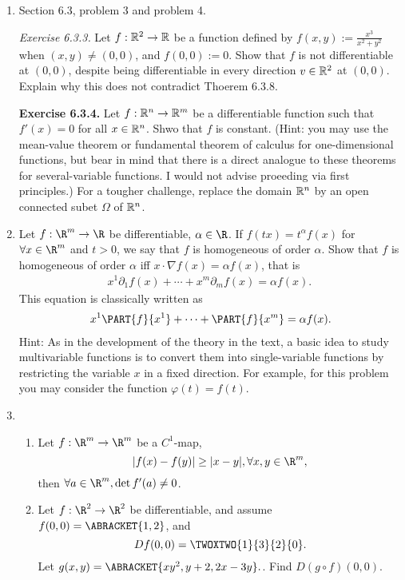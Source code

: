 \documentclass[10pt,a4paper]{report}
\begin{document}
\begin{enumerate}[label=\Roman*.]
	\item Section 6.3, problem 3 and problem 4.
	
	\textit{Exercise 6.3.3.}  Let $f: \mathbb{R}^2 \to \mathbb{R}$ be a function defined by $f(x,y) := \frac{x^3}{x^2+y^2}$ when $(x,y) \ne (0,0)$, and $f(0,0) := 0$.  Show that $f$ is not differentiable at $(0,0)$, despite being differentiable in every direction $v \in \mathbb{R}^2$ at $(0,0)$. Explain why this does not contradict Thoerem 6.3.8.
	
	\textbf{Exercise 6.3.4.}  Let $f: \mathbb{R}^n \to \mathbb{R}^m$ be a differentiable function such that $f'(x) = 0$ for all $x \in \mathbb{R}^n$.  Shwo that $f$ is constant.  (Hint: you may use the mean-value theorem or fundamental theorem of calculus for one-dimensional functions, but bear in mind that there is a direct analogue to these theorems for several-variable functions.  I would not advise proeeding via first principles.)  For a tougher challenge, replace the domain $\mathbb{R}^n$ by an open connected subet $\Omega$ of $\mathbb{R}^n$.

\item Let $f: \R^m \to \R$ be differentiable, $\alpha \in \R$.  If $f(tx)=t^\alpha f(x)$	for $\forall x \in \R^m$ and $t> 0$, we say that $f$ is homogeneous of order $\alpha$.  Show that $f$ is homogeneous of order $\alpha$ iff $x \cdot \nabla f(x)=\alpha f(x)$, that is
\begin{align*}
	x^1\partial_1 f(x)+\cdots+x^m\partial_m f(x) = \alpha f(x). \
\end{align*}This equation is classically written as 
\begin{align*}
	x^1 \PART{f}{x^1}+\cdots+\PART{f}{x^m} = \alpha f(x).
\end{align*}Hint: As in the development of the theory in the text, a basic idea to study multivariable functions is to convert them into single-variable functions by restricting the variable $x$ in a fixed direction.  For example, for this problem you may consider the function $\varphi(t) = f(t)$.
	
\item \begin{enumerate}[label=(\alph*)]

	\item Let $f: \R^m \to \R^m$ be a $C^1$-map,$$ |f(x)-f(y)|\ge |x-y|, \forall x,y \in \R^m,$$ then $\forall a \in \R^m, \det f'(a) \ne 0$.
	
	\item Let $f: \R^2\to \R^2$ be differentiable, and assume $f(0,0)=\ABRACKET{1,2}$, and $$ Df(0,0)=\TWOXTWO{1}{3}{2}{0}.$$ Let $g(x,y)=\ABRACKET{xy^2, y+2, 2x-3y}.$.  Find $D(g\circ f)(0,0)$.
	

\end{enumerate}
\end{enumerate}
\end{document}
